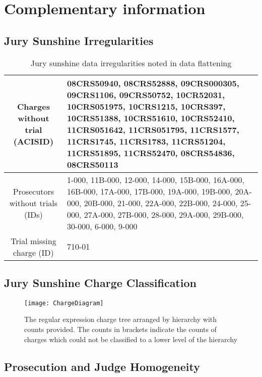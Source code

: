 \chapter{Complementary information}
\label{app:complement}

\section{Jury Sunshine Irregularities} \label{app:irregs}

\begin{table}[h]
  \caption[Jury Sunshine Irregularities]{Jury sunshine data irregularities noted in data flattening}
  \centering
  \begin{tabularx}{\textwidth}{|c|X|} \hline
    Charges without trial (ACISID) & 08CRS50940, 08CRS52888, 09CRS000305, 09CRS1106, 09CRS50752, 10CR52031, 10CRS051975,
    10CRS1215, 10CRS397, 10CRS51388, 10CRS51610, 10CRS52410, 11CRS051642, 11CRS051795, 11CRS1577, 11CRS1745, 11CRS1783,
    11CRS51204, 11CRS51895, 11CRS52470, 08CRS54836, 08CRS50113 \\ \hline 
    Prosecutors without trials (IDs) & 1-000, 11B-000, 12-000, 14-000, 15B-000, 16A-000,
                     16B-000, 17A-000, 17B-000, 19A-000, 19B-000,
                     20A-000, 20B-000, 21-000, 22A-000, 22B-000,
                     24-000, 25-000, 27A-000, 27B-000, 28-000,
                                       29A-000, 29B-000, 30-000, 6-000, 9-000 \\ \hline
    Trial missing charge (ID) & 710-01 \\ \hline
  \end{tabularx}
\end{table}

\section{Jury Sunshine Charge Classification} \label{app:charge}

\begin{figure}[!h]
  \centering
  \texttt{[image: ChargeDiagram]}
  \caption[Regular expression charge tree visualized]{The regular expression charge tree arranged by hierarchy with counts
    provided. The counts in brackets indicate the counts of charges which could not be classified to a lower level of the
    hierarchy}
  \label{fig:chargetree}
\end{figure}

\section{Prosecution and Judge Homogeneity} \label{sec:causepro}

